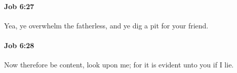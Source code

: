 		\paragraph{Job 6:27} %
			\label{JOB-6-27}

			Yea, ye overwhelm the fatherless, and ye dig a pit for your friend.


		\paragraph{Job 6:28} %
			\label{JOB-6-28}

			Now therefore be content, look upon me; for it is evident unto you if I lie.


